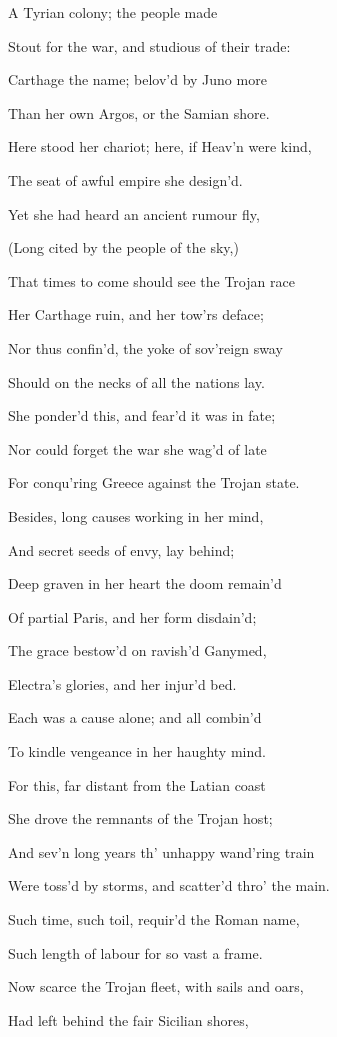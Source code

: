 A Tyrian colony; the people made

Stout for the war, and studious of their trade:

Carthage the name; belov’d by Juno more

Than her own Argos, or the Samian shore.

Here stood her chariot; here, if Heav’n were kind,

The seat of awful empire she design’d.

Yet she had heard an ancient rumour fly,

(Long cited by the people of the sky,)

That times to come should see the Trojan race

Her Carthage ruin, and her tow’rs deface;

Nor thus confin’d, the yoke of sov’reign sway

Should on the necks of all the nations lay.

She ponder’d this, and fear’d it was in fate;

Nor could forget the war she wag’d of late

For conqu’ring Greece against the Trojan state.

Besides, long causes working in her mind,

And secret seeds of envy, lay behind;

Deep graven in her heart the doom remain’d

Of partial Paris, and her form disdain’d;

The grace bestow’d on ravish’d Ganymed,

Electra’s glories, and her injur’d bed.

Each was a cause alone; and all combin’d

To kindle vengeance in her haughty mind.

For this, far distant from the Latian coast

She drove the remnants of the Trojan host;

And sev’n long years th’ unhappy wand’ring train

Were toss’d by storms, and scatter’d thro’ the main.

Such time, such toil, requir’d the Roman name,

Such length of labour for so vast a frame.

Now scarce the Trojan fleet, with sails and oars,

Had left behind the fair Sicilian shores,

